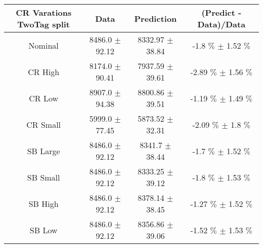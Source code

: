 \begin{footnotesize} 
\begin{tabular}{c|c|c|c} 
CR Varations TwoTag split & Data & Prediction & (Predict - Data)/Data \\ 
\hline\hline 
Nominal & 8486.0 $\pm$ 92.12 & 8332.97 $\pm$ 38.84 & -1.8 $\%$  $\pm$ 1.52 $\%$ \\ 
\hline 
CR High & 8174.0 $\pm$ 90.41 & 7937.59 $\pm$ 39.61 & -2.89 $\%$  $\pm$ 1.56 $\%$ \\ 
\hline 
CR Low & 8907.0 $\pm$ 94.38 & 8800.86 $\pm$ 39.51 & -1.19 $\%$  $\pm$ 1.49 $\%$ \\ 
\hline 
CR Small & 5999.0 $\pm$ 77.45 & 5873.52 $\pm$ 32.31 & -2.09 $\%$  $\pm$ 1.8 $\%$ \\ 
\hline 
SB Large & 8486.0 $\pm$ 92.12 & 8341.7 $\pm$ 38.44 & -1.7 $\%$  $\pm$ 1.52 $\%$ \\ 
\hline 
SB Small & 8486.0 $\pm$ 92.12 & 8333.25 $\pm$ 39.12 & -1.8 $\%$  $\pm$ 1.53 $\%$ \\ 
\hline 
SB High & 8486.0 $\pm$ 92.12 & 8378.14 $\pm$ 38.45 & -1.27 $\%$  $\pm$ 1.52 $\%$ \\ 
\hline 
SB Low & 8486.0 $\pm$ 92.12 & 8356.86 $\pm$ 39.06 & -1.52 $\%$  $\pm$ 1.53 $\%$ \\ 
\hline\hline 
\end{tabular} 
\end{footnotesize} 
\newline 
